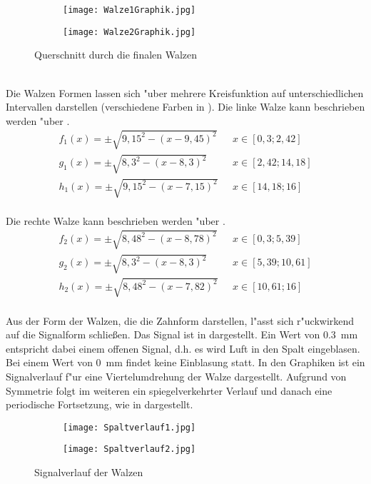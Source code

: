 \begin{figure}[h]
	\centering
	\begin{subfigure}[c]{0.4\textwidth}		
		\texttt{[image: Walze1Graphik.jpg]}
	\end{subfigure}
	\begin{subfigure}[c]{0.4\textwidth}
		\texttt{[image: Walze2Graphik.jpg]}
	\end{subfigure}
	\caption{Querschnitt durch die finalen Walzen}
	\label{fig:finalesdesign}
\end{figure}\\

Die Walzen Formen lassen sich "uber mehrere Kreisfunktion auf unterschiedlichen Intervallen darstellen (verschiedene Farben in ). Die linke Walze kann beschrieben werden "uber .
\begin{align}
	{f_1(x)}=\pm\sqrt{9,15^{2}-(x-9,45)^{2}}\,\,\,\,&x\in[0,3; 2,42] \label{eq:Walze1}\\
	{g_1(x)}=\pm\sqrt{8,3^{2}-(x-8,3)^{2}}\,\,\,\,&x\in[2,42; 14,18] \nonumber\\
	{h_1(x)}=\pm\sqrt{9,15^{2}-(x-7,15)^{2}}\,\,\,\,&x\in[14,18; 16] \nonumber
\end{align}\\
Die rechte Walze kann beschrieben werden "uber .
\begin{align}
	{f_2(x)}=\pm\sqrt{8,48^{2}-(x-8,78)^{2}}\,\,\,\,&x\in[0,3; 5,39] \label{eq:Walze2}\\
	{g_2(x)}=\pm\sqrt{8,3^{2}-(x-8,3)^{2}}\,\,\,\,&x\in[5,39; 10,61] \nonumber\\
	{h_2(x)}=\pm\sqrt{8,48^{2}-(x-7,82)^{2}}\,\,\,\,&x\in[10,61; 16] \nonumber
\end{align}\\
Aus der Form der Walzen, die die Zahnform darstellen, l"asst sich r"uckwirkend auf die Signalform schlie\ss{}en. Das Signal ist in  dargestellt. Ein Wert von \SI{0,3}{\milli\meter} entspricht dabei einem offenen Signal, d.h. es wird Luft in den Spalt eingeblasen. Bei einem Wert von \SI{0}{\milli\meter} findet keine Einblasung statt. In den Graphiken ist ein Signalverlauf f"ur eine Viertelumdrehung der Walze dargestellt. Aufgrund von Symmetrie folgt im weiteren ein spiegelverkehrter Verlauf und danach eine periodische Fortsetzung, wie in  dargestellt.
\begin{figure}[h]
	\centering
	\begin{subfigure}[c]{0.7\textwidth}		
		\texttt{[image: Spaltverlauf1.jpg]}
	\end{subfigure}
	\begin{subfigure}[c]{0.7\textwidth}
		\texttt{[image: Spaltverlauf2.jpg]}
	\end{subfigure}
	\caption{Signalverlauf der Walzen}
	\label{fig:spaltverlauf}
\end{figure}


